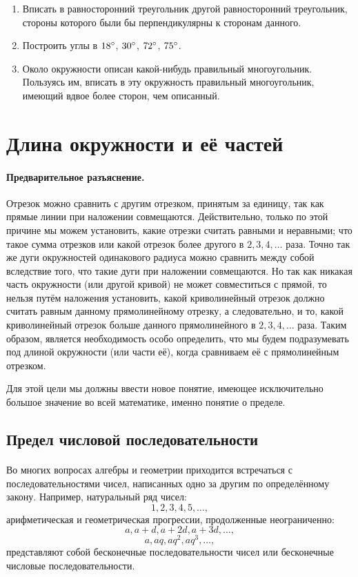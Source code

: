 \documentclass[oneside]{book}
\begin{document}
\begin{enumerate}
 \item
Вписать в равносторонний треугольник другой равносторонний треугольник, стороны которого были бы перпендикулярны к сторонам данного.

 \item
Построить углы в $18\degree$, $30\degree$, $72\degree$, $75\degree$.

\item
Около окружности описан какой-нибудь правильный многоугольник.
Пользуясь им, вписать в эту окружность правильный многоугольник, имеющий вдвое более сторон, чем описанный.

\end{enumerate}

\section{Длина окружности и её частей}

\paragraph{Предварительное разъяснение.}\label{1938/226}
Отрезок можно сравнить с другим отрезком, принятым за единицу, так как прямые линии при наложении совмещаются.
Действительно, только по этой причине мы можем установить, какие отрезки считать равными и неравными;
что такое сумма отрезков или какой отрезок более другого в $2, 3, 4,\dots$ раза.
Точно так же дуги окружностей одинакового радиуса можно сравнить между собой вследствие того, что такие дуги при наложении совмещаются.
Но так как никакая часть окружности (или другой кривой) не может совместиться с прямой, то нельзя путём наложения установить, какой криволинейный отрезок должно считать равным данному прямолинейному отрезку, а следовательно, и то, какой криволинейный отрезок больше данного прямолинейного в $2,3,4,\dots$
раза.
Таким образом, является необходимость особо определить, что мы будем подразумевать под длиной окружности (или части её), когда сравниваем её с прямолинейным отрезком.

Для этой цели мы должны ввести новое понятие, имеющее исключительно большое значение во всей математике, именно понятие о пределе.

\subsection*{Предел числовой последовательности}

\paragraph{}\label{1938/227}
Во многих вопросах алгебры и геометрии приходится встречаться с последовательностями чисел, написанных одно за другим по определённому закону.
Например, натуральный ряд чисел:
\[1, 2, 3, 4, 5,\dots,\]
арифметическая и геометрическая прогрессии, продолженные неограниченно:
\[a,a+d,a+2d,a+3d,\dots,\]
\[a,aq,aq^2,aq^3,\dots,\]
представляют собой бесконечные последовательности чисел или бесконечные числовые последовательности.
\end{document}
